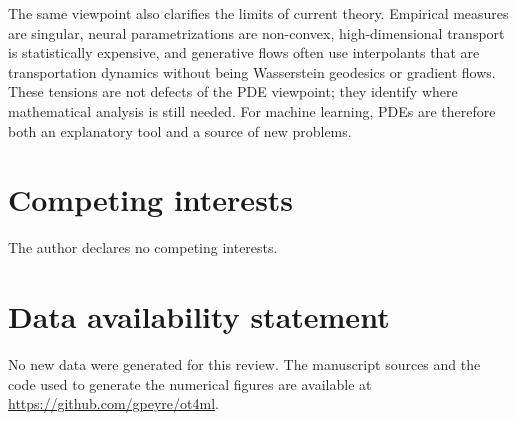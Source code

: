 \documentclass{acta-numerica}
\begin{document}
The same viewpoint also clarifies the limits of current theory. Empirical measures are singular, neural parametrizations are non-convex, high-dimensional transport is statistically expensive, and generative flows often use interpolants that are transportation dynamics without being Wasserstein geodesics or gradient flows. These tensions are not defects of the PDE viewpoint; they identify where mathematical analysis is still needed. For machine learning, PDEs are therefore both an explanatory tool and a source of new problems.

\section*{Competing interests}
The author declares no competing interests.

\section*{Data availability statement}
No new data were generated for this review. The manuscript sources and the code used to generate the numerical figures are available at \url{https://github.com/gpeyre/ot4ml}.

\begingroup
\sloppy
\hfuzz=1pt
\setlength{\emergencystretch}{2em}


\endgroup
\end{document}
